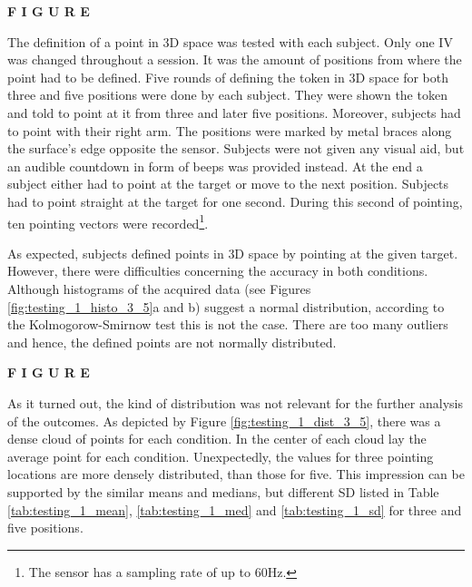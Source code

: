 \textbf{F I G U R E}

The definition of a point in \ac{3D} space was tested with each subject. Only one \ac{IV} was changed throughout a session. It was the amount of positions from where the point had to be defined. Five rounds of defining the token in \ac{3D} space for both three and five positions were done by each subject. They were shown the token and told to point at it from three and later five positions. Moreover, subjects had to point with their right arm. The positions were marked by metal braces along the surface's edge opposite the sensor. Subjects were not given any visual aid, but an audible countdown in form of beeps was provided instead. At the end a subject either had to point at the target or move to the next position. Subjects had to point straight at the target for one second. During this second of pointing, ten pointing vectors were recorded\footnote{The sensor has a sampling rate of up to 60Hz.}.  

As expected, subjects defined points in \ac{3D} space by pointing at the given target. However, there were difficulties concerning the accuracy in both conditions. Although histograms of the acquired data (see Figures \ref{fig:testing_1_histo_3_5}a and b) suggest a normal distribution, according to the Kolmogorow-Smirnow test this is not the case. There are too many outliers and hence, the defined points are not normally distributed.

\textbf{F I G U R E}

As it turned out, the kind of distribution was not relevant for the further analysis of the outcomes. As depicted by Figure \ref{fig:testing_1_dist_3_5}, there was a dense cloud of points for each condition. In the center of each cloud lay the average point for each condition. Unexpectedly, the values for three pointing locations are more densely distributed, than those for five. This impression can be supported by the similar means and medians, but different \ac{SD} listed in Table \ref{tab:testing_1_mean}, \ref{tab:testing_1_med} and \ref{tab:testing_1_sd} for three and five positions. 

